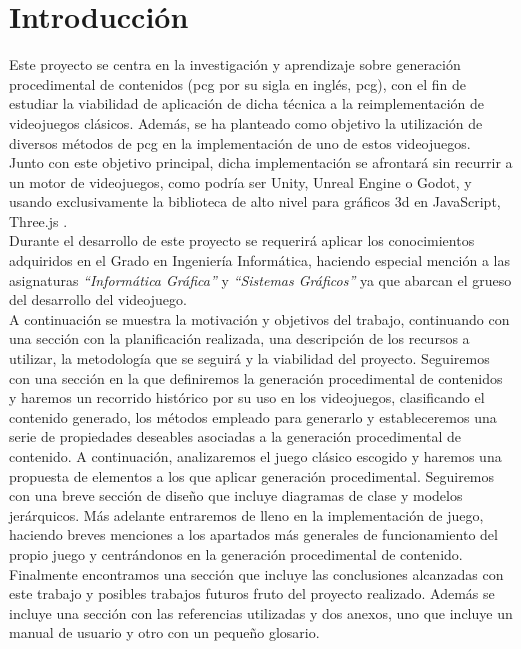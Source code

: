 \section{Introducción}

Este proyecto se centra en la investigación y aprendizaje sobre generación procedimental de contenidos (\acrshort{pcg} por su sigla en inglés, \acrlong{pcg}), con el fin de estudiar la viabilidad de aplicación de dicha técnica a la reimplementación de videojuegos clásicos. Además, se ha planteado como objetivo la utilización de diversos métodos de \acrshort{pcg} en la implementación de uno de estos videojuegos.\\

Junto con este objetivo principal, dicha implementación se afrontará sin recurrir a un motor de videojuegos, como podría ser Unity, Unreal Engine o Godot, y usando exclusivamente la biblioteca de alto nivel para gráficos \acrshort{3d} en JavaScript, Three.js \cite{three.js}.\\

Durante el desarrollo de este proyecto se requerirá aplicar los conocimientos adquiridos en el Grado en Ingeniería Informática, haciendo especial mención a las asignaturas \textit{``Informática Gráfica''} y \textit{``Sistemas Gráficos''} ya que abarcan el grueso del desarrollo del videojuego.\\

A continuación se muestra la motivación y objetivos del trabajo, continuando con una sección con la planificación realizada, una descripción de los recursos a utilizar, la metodología que se seguirá y la viabilidad del proyecto. Seguiremos con una sección en la que definiremos la generación procedimental de contenidos y haremos un recorrido histórico por su uso en los videojuegos, clasificando el contenido generado, los métodos empleado para generarlo y estableceremos una serie de propiedades deseables asociadas a la generación procedimental de contenido. A continuación, analizaremos el juego clásico escogido y haremos una propuesta de elementos a los que aplicar generación procedimental. Seguiremos con una breve sección de diseño que incluye diagramas de clase y modelos jerárquicos. Más adelante entraremos de lleno en la implementación de juego, haciendo breves menciones a los apartados más generales de funcionamiento del propio juego y centrándonos en la generación procedimental de contenido. Finalmente encontramos una sección que incluye las conclusiones alcanzadas con este trabajo y posibles trabajos futuros fruto del proyecto realizado. Además se incluye una sección con las referencias utilizadas y dos anexos, uno que incluye un manual de usuario y otro con un pequeño glosario.

